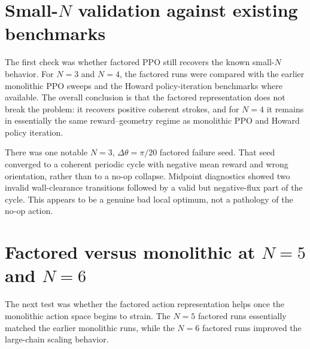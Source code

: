 \documentclass[11pt]{article}
\newcommand{\dth}{\Delta\theta}
\begin{document}
\section{Small-$N$ validation against existing benchmarks}

The first check was whether factored PPO still recovers the known small-$N$ behavior. For $N=3$ and $N=4$, the factored runs were compared with the earlier monolithic PPO sweeps and the Howard policy-iteration benchmarks where available. The overall conclusion is that the factored representation does not break the problem: it recovers positive coherent strokes, and for $N=4$ it remains in essentially the same reward--geometry regime as monolithic PPO and Howard policy iteration.

There was one notable $N=3$, $\dth=\pi/20$ factored failure seed. That seed converged to a coherent periodic cycle with negative mean reward and wrong orientation, rather than to a no-op collapse. Midpoint diagnostics showed two invalid wall-clearance transitions followed by a valid but negative-flux part of the cycle. This appears to be a genuine bad local optimum, not a pathology of the no-op action.

\section{Factored versus monolithic at $N=5$ and $N=6$}

The next test was whether the factored action representation helps once the monolithic action space begins to strain. The $N=5$ factored runs essentially matched the earlier monolithic runs, while the $N=6$ factored runs improved the large-chain scaling behavior.
\end{document}
